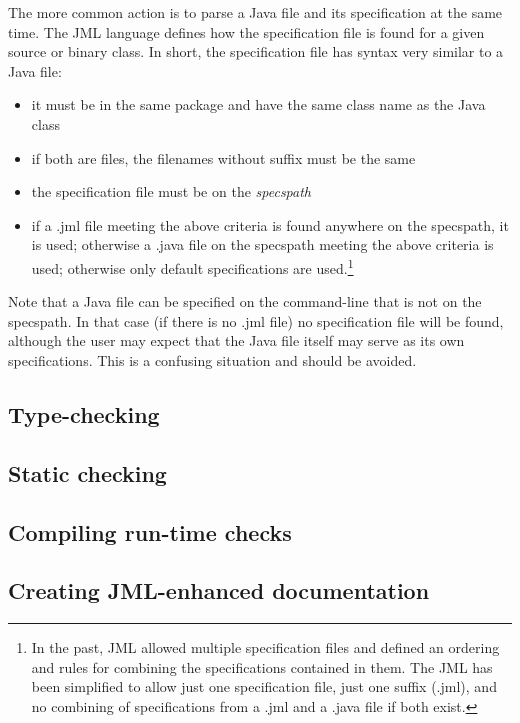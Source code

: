 \documentclass{report}%
\begin{document}
The more common action is to parse a Java file and its specification at the same time. The JML language defines how the specification file is found for a given source or binary class. In short, the specification file has syntax very similar to 
a Java file:
\begin{itemize}
\item it must be in the same package and have the same class name as the Java class
\item if both are files, the filenames without suffix must be the same
\item the specification file must be on the {\em specspath}
\item if a .jml file meeting the above criteria is found anywhere on the specspath, it is used; otherwise a .java file on the specspath meeting
the above criteria is used; otherwise only default specifications are used.\footnote{In the past, JML allowed multiple specification files and defined an ordering and rules for combining the specifications contained in them. The JML has been 
simplified to allow just one specification file, just one suffix (.jml), and no combining of specifications from a .jml and a .java file if both exist.}
\end{itemize}
Note that a Java file can be specified on the command-line that is not on the specspath. In that case (if there is no .jml file) 
no specification file will be found, although the user may expect that the Java file itself may serve as its own specifications.
This is a confusing situation and should be avoided.


\subsection{Type-checking}

\subsection{Static checking}

\subsection{Compiling run-time checks}

\subsection{Creating JML-enhanced documentation}
\end{document}
